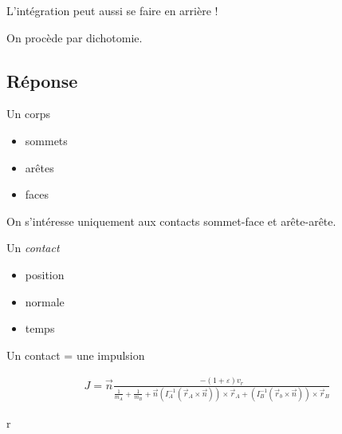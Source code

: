 \documentclass{beamer}
\begin{document}
\begin{frame}
  L'intégration peut aussi se faire en arrière !

  On procède par dichotomie.

  \begin{figure}
    \centering
    
  \end{figure}
\end{frame}

\subsection{Réponse}

\begin{frame}
  Un corps
  \begin{itemize}
    \item sommets
    \item arêtes
    \item faces
  \end{itemize}

  On s'intéresse uniquement aux contacts sommet-face et arête-arête.

  \begin{figure}
    \centering
    
    
  \end{figure}
\end{frame}

\begin{frame}
  Un \textit{contact}
  \begin{itemize}
    \item position
    \item normale
    \item temps
  \end{itemize}

  Un contact = une impulsion

  \begin{align*}
    J = \vec{n} 
    \frac{-(1 + \varepsilon) v_r}{
      \frac{1}{m_A} +
      \frac{1}{m_B} +
      \vec{n}
      (I_A^{-1} (\vec{r}_A \times \vec{n})) \times \vec{r}_A +
      (I_B^{-1} (\vec{r}_b \times \vec{n})) \times \vec{r}_B
    }
  \end{align*}

  r
\end{frame}

\begin{frame}

\end{frame}
\end{document}
